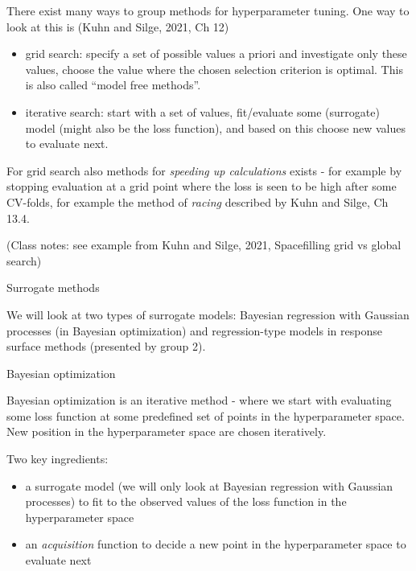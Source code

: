 \documentclass[
  ignorenonframetext,
]{beamer}
\providecommand{\tightlist}{%
  \setlength{\itemsep}{0pt}\setlength{\parskip}{0pt}}
\begin{document}
\begin{frame}

There exist many ways to group methods for hyperparameter tuning. One
way to look at this is (Kuhn and Silge, 2021, Ch 12)

\begin{itemize}
\tightlist
\item
  grid search: specify a set of possible values a priori and investigate
  only these values, choose the value where the chosen selection
  criterion is optimal. This is also called ``model free methods''.
\item
  iterative search: start with a set of values, fit/evaluate some
  (surrogate) model (might also be the loss function), and based on this
  choose new values to evaluate next.
\end{itemize}

For grid search also methods for \emph{speeding up calculations} exists
- for example by stopping evaluation at a grid point where the loss is
seen to be high after some CV-folds, for example the method of
\emph{racing} described by Kuhn and Silge, Ch 13.4.

(Class notes: see example from Kuhn and Silge, 2021, Spacefilling grid
vs global search)

\end{frame}

\begin{frame}

\begin{block}{Surrogate methods}

We will look at two types of surrogate models: Bayesian regression with
Gaussian processes (in Bayesian optimization) and regression-type models
in response surface methods (presented by group 2).

\end{block}

\begin{block}{Bayesian optimization}

Bayesian optimization is an iterative method - where we start with
evaluating some loss function at some predefined set of points in the
hyperparameter space. New position in the hyperparameter space are
chosen iteratively.

Two key ingredients:

\begin{itemize}
\tightlist
\item
  a surrogate model (we will only look at Bayesian regression with
  Gaussian processes) to fit to the observed values of the loss function
  in the hyperparameter space
\item
  an \emph{acquisition} function to decide a new point in the
  hyperparameter space to evaluate next
\end{itemize}

\end{block}

\end{frame}
\end{document}
